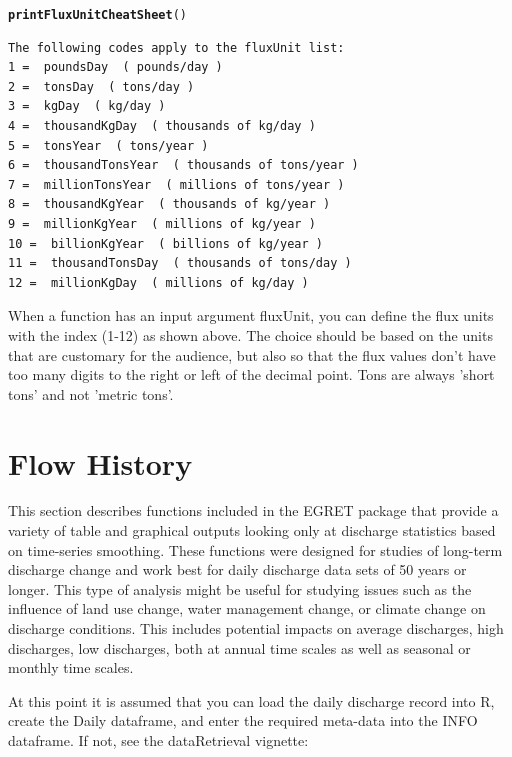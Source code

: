 \documentclass[a4paper,11pt]{article}\usepackage[]{graphicx}\usepackage[]{color}
\makeatletter
\newcommand{\hlstd}[1]{\textcolor[rgb]{0.345,0.345,0.345}{#1}}%
\newcommand{\hlkwd}[1]{\textcolor[rgb]{0.737,0.353,0.396}{\textbf{#1}}}%
\newenvironment{kframe}{%
 \def\at@end@of@kframe{}%
 \ifinner\ifhmode%
  \def\at@end@of@kframe{\end{minipage}}%
  \begin{minipage}{\columnwidth}%
 \fi\fi%
 \def\FrameCommand##1{\hskip\@totalleftmargin \hskip-\fboxsep
 \colorbox{shadecolor}{##1}\hskip-\fboxsep
     \hskip-\linewidth \hskip-\@totalleftmargin \hskip\columnwidth}%
 \MakeFramed {\advance\hsize-\width
   \@totalleftmargin\z@ \linewidth\hsize
   \@setminipage}}%
 {\par\unskip\endMakeFramed%
 \at@end@of@kframe}
\newenvironment{knitrout}{}{} %
\makeatother
\begin{document}
\begin{knitrout}
\color{fgcolor}\begin{kframe}
\begin{alltt}
\hlkwd{printFluxUnitCheatSheet}\hlstd{()}
\end{alltt}
\begin{verbatim}
The following codes apply to the fluxUnit list:
1 =  poundsDay  ( pounds/day )
2 =  tonsDay  ( tons/day )
3 =  kgDay  ( kg/day )
4 =  thousandKgDay  ( thousands of kg/day )
5 =  tonsYear  ( tons/year )
6 =  thousandTonsYear  ( thousands of tons/year )
7 =  millionTonsYear  ( millions of tons/year )
8 =  thousandKgYear  ( thousands of kg/year )
9 =  millionKgYear  ( millions of kg/year )
10 =  billionKgYear  ( billions of kg/year )
11 =  thousandTonsDay  ( thousands of tons/day )
12 =  millionKgDay  ( millions of kg/day )
\end{verbatim}
\end{kframe}
\end{knitrout}


When a function has an input argument fluxUnit, you can define the flux units with the index (1-12) as shown above. The choice should be based on the units that are customary for the audience, but also so that the flux values don't have too many digits to the right or left of the decimal point. Tons are always 'short tons' and not 'metric tons'.

\FloatBarrier

\section{Flow History}
\label{sec:flowHistory}
This section describes functions included in the EGRET package that provide a variety of table and graphical outputs looking only at discharge statistics based on time-series smoothing. These functions were designed for studies of long-term discharge change and work best for daily discharge data sets of 50 years or longer. This type of analysis might be useful for studying issues such as the influence of land use change, water management change, or climate change on discharge conditions.  This includes potential impacts on average discharges, high discharges, low discharges, both at annual time scales as well as seasonal or monthly time scales. 

At this point it is assumed that you can load the daily discharge record into R, create the Daily dataframe, and enter the required meta-data into the INFO dataframe. If not, see the dataRetrieval vignette:
\end{document}
